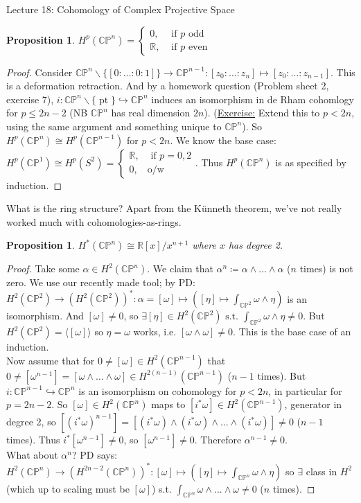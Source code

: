 \documentclass[10pt]{article}
\theoremstyle{plain}
\newtheorem{prop}[thm]{Proposition}
\theoremstyle{definition}
\newcommand{\st}{\text{ s.t. }}
\newcommand{\myif}{\text{ if }}
\newcommand{\Real}{\mathbb{R}}
\newcommand{\CProj}{\mathbb{CP}}
\newcommand{\mycasesthing}[2]{\begin{cases} #1 \\ #2\end{cases}}
\DeclareMathOperator{\pt}{pt}
\begin{document}
\begin{section}{Lecture 18: Cohomology of Complex Projective Space}
\begin{prop}
$H^p(\CProj^n) = \mycasesthing{ 0,& \myif p \text{ odd}}{\Real, & \myif p \text{ even}} $
\end{prop}
\begin{proof}
Consider $\CProj^n \backslash \{ [0:\ldots:0:1]\} \to \CProj^{n-1} : [z_0: \ldots : z_{n}] \mapsto [z_0: \ldots : z_{n-1}]$. This is a deformation retraction. And by a homework question (Problem sheet 2, exercise 7), $i : \CProj ^n \backslash \{\pt\} \hookrightarrow \CProj^n$ induces an isomorphism in de Rham cohomlogy for $p \leq 2n-2$ (NB $\CProj^n$ has real dimension $2n$). (\underline{Exercise:} Extend this to $p<2n$, using the same argument and something unique to $\CProj^n$). So $H^p(\CProj^n) \cong H^p(\CProj^{n-1})$ for $p<2n$. We know the base case: $H^p(\CProj^1) \cong  H^p(S^2) = \mycasesthing{\Real,& \myif p =0,2}{0,& \text{o/w}}$. Thus $H^p(\CProj^n)$ is as specified by induction.
\end{proof}
\noindent
What is the ring structure? Apart from the K\"unneth theorem, we've not really worked much with cohomologies-as-rings.\\
\begin{prop}
   $H^*(\CProj^n) \cong \Real[x] / x^{n+1}$ where $x$ has degree 2.
\end{prop} 
 \begin{proof}
    Take some $\alpha \in H^2(\CProj^n)$. We claim that $\alpha^n \coloneqq \alpha\wedge\ldots\wedge\alpha$ ($n$ times) is not zero. We use our recently made tool; by PD: $H^2(\CProj^2) \to (H^2(\CProj^2))^* : \alpha = [\omega] \mapsto ([\eta] \mapsto \int_{\CProj^2} \omega \wedge \eta)$ is an isomorphism. And $[\omega] \neq 0$, so $\exists [\eta] \in H^2(\CProj^2) \st \int_{\CProj^2} \omega \wedge \eta \neq 0$. But $H^2(\CProj^2) = \langle [\omega]\rangle$ so $\eta = \omega$ works, i.e. $[\omega \wedge \omega] \neq 0$. This is the base case of an induction.\\
    Now assume that for $0\neq [\omega] \in H^2(\CProj^{n-1})$ that $0 \neq[ \omega^{n-1}]= [\omega \wedge \ldots \wedge \omega] \in H^{2(n-1)}(\CProj^{n-1})$ ($n-1$ times). But $i : \CProj^{n-1} \hookrightarrow \CProj^n$ is an isomorphism on cohomology for $p < 2n$, in particular for $p = 2n-2$. So $[\omega] \in H^2(\CProj^n)$ maps to $[i^*\omega] \in H^2(\CProj^{n-1})$, generator in degree 2, so $[(i^*\omega)^{n-1}]= [(i^*\omega) \wedge(i^*\omega) \wedge \ldots \wedge (i^*\omega)] \neq 0$ ($n-1$ times). Thus $i^*[\omega^{n-1}] \neq 0$, so $[\omega^{n-1}] \neq 0$. Therefore $\alpha^{n-1} \neq 0$.  \\
    What about $\alpha^n$? PD says: $H^2(\CProj^n) \to (H^{2n-2}(\CProj^n))^* : [\omega] \mapsto ([\eta] \mapsto \int_{\CProj^n} \omega \wedge \eta)$ so $\exists$ class in $H^2$ (which up to scaling must be $[\omega]$) s.t. $\int_{\CProj^n} \omega \wedge ... \wedge \omega \neq 0$ ($n$ times).
 \end{proof}
\end{section}
\end{document}

